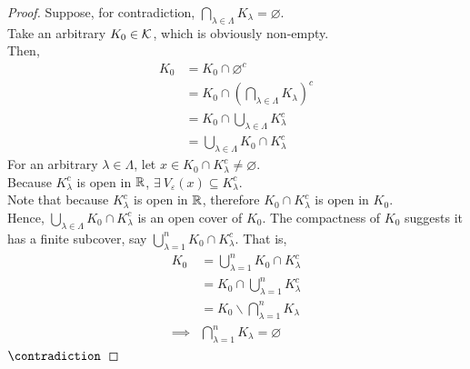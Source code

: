 \documentclass[11pt]{article}
\begin{document}
 	\begin{proof}
 		Suppose, for contradiction, $\bigcap_{\lambda \in \Lambda} K_\lambda = \varnothing$. \\
 		Take an arbitrary $K_0 \in \mathcal{{K}}$, which is obviously non-empty. \\
 		Then,
 		\begin{align}
 			K_0 &= K_0 \cap \varnothing^c \\
 			&= K_0 \cap \left(\bigcap_{\lambda \in \Lambda} K_\lambda\right)^c \\
 			&= K_0 \cap \bigcup_{\lambda \in \Lambda} K_\lambda^c \\
 			&= \bigcup_{\lambda \in \Lambda} K_0 \cap K_\lambda^c
 		\end{align}
 		For an arbitrary $\lambda \in \Lambda$, let $x \in K_0 \cap K_\lambda^c \neq \varnothing$. \\
 		Because $K_\lambda^c$ is open in $\mathbb{R}$, $\exists\ V_\varepsilon(x) \subseteq K_\lambda^c$. \\
 		Note that because $K_\lambda^c$ is open in $\mathbb{R}$, therefore $K_0 \cap K_\lambda^c$ is open in $K_0$. \\
 		Hence, $\bigcup_{\lambda \in \Lambda} K_0 \cap K_\lambda^c$ is an open cover of $K_0$. The compactness of $K_0$ suggests it has a finite subcover, say $\bigcup_{\lambda=1}^n K_0 \cap K_\lambda^c$. That is,
 		\begin{align}
 			K_0 &= \bigcup_{\lambda=1}^n K_0 \cap K_\lambda^c \\
 			&= K_0 \cap \bigcup_{\lambda=1}^n K_\lambda^c \\
 			&= K_0 \backslash \bigcap_{\lambda=1}^n K_\lambda \\
 			\implies &\bigcap_{\lambda=1}^n K_\lambda = \varnothing
 		\end{align}
 		$\contradiction$
 	\end{proof}
\end{document}
